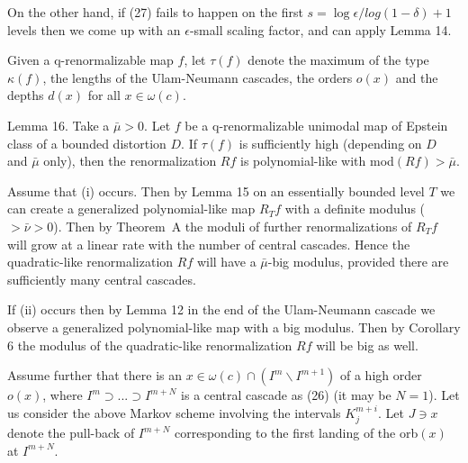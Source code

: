 On the other hand, if (27) fails to happen on the first
$s=\log\epsilon/log(1-\delta)+1$ levels then we come up with an
$\epsilon$-small scaling factor, and can  apply Lemma 14.  \QED

Given a q-renormalizable map $f$, let $\tau(f)$ denote the maximum of the 
type $\kappa(f)$, the lengths of the Ulam-Neumann cascades, 
the orders $o(x)$ and the depths $d(x)$ for all $x\in \omega(c)$.



\proclaim Lemma 16. Take  a  $\bar\mu>0$.
  Let $f$ be a q-renormalizable unimodal map of Epstein class
  of a bounded distortion $D$. If $\tau (f)$ is sufficiently high
  (depending on $D$ and $\bar\mu$ only), then 
the renormalization $Rf$ is polynomial-like with mod$(Rf)>\bar\mu$.  




 Assume that (i)  occurs.
 Then  by Lemma 15 on an essentially bounded level $T$ we can
  create a generalized 
  polynomial-like map  $R_T f$ with a definite modulus 
   ($>\bar \nu>0$). Then by Theorem~A the moduli of further renormalizations
   of $R_T f$ will grow at a linear rate with the number of central cascades.
    Hence the quadratic-like renormalization $Rf$ will have 
    a $\bar\mu$-big modulus, provided there are sufficiently many central
  cascades.
 
If (ii) occurs then by Lemma 12 in the end of the Ulam-Neumann cascade 
we observe a generalized polynomial-like map with a big modulus.
Then by Corollary 6 the modulus
of the quadratic-like renormalization $Rf$ will be big as well.


  Assume further that there is an $x\in \omega(c)\cap (I^m\backslash I^{m+1})$
of a high order $o(x)$,
where $I^m\supset...\supset I^{m+N}$ is a central cascade as (26)
(it may be $N=1$). Let us consider the above Markov scheme involving the
 intervals $K^{m+i}_j$. Let $J\ni x$ denote the pull-back of $I^{m+N}$
 corresponding to the first landing of the orb$(x)$ at $I^{m+N}$.

